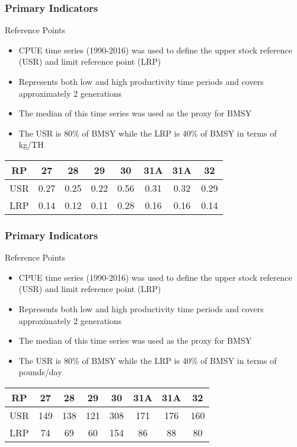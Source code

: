 \documentclass{beamer}
\begin{document}
\begin{frame}
\frametitle{Primary Indicators}
Reference Points
\begin{itemize}
\item CPUE time series (1990-2016) was used to define the upper stock reference (USR) and limit reference point (LRP) 
\item Represents both low and high productivity time periods and covers approximately 2 generations 
\item The median of this time series was used as the proxy for BMSY 
\item The USR is 80\% of BMSY while the LRP is 40\% of BMSY in terms of kg/TH
\end{itemize}
\centering
\begin{tabular}{|c|c|c|c|c|c|c|c|}
\hline
RP & 27 & 28 & 29 & 30 & 31A & 31A & 32 \\
\hline
USR & 0.27 & 0.25 & 0.22 & 0.56 & 0.31 & 0.32 & 0.29 \\
\hline
LRP & 0.14 & 0.12  & 0.11  & 0.28  & 0.16  & 0.16  & 0.14 \\
\hline
\end{tabular}
\end{frame}



\begin{frame}
\frametitle{Primary Indicators}
Reference Points
\begin{itemize}
\item CPUE time series (1990-2016) was used to define the upper stock reference (USR) and limit reference point (LRP) 
\item Represents both low and high productivity time periods and covers approximately 2 generations 
\item The median of this time series was used as the proxy for BMSY 
\item The USR is 80\% of BMSY while the LRP is 40\% of BMSY in terms of pounds/day
\end{itemize}
\centering
\begin{tabular}{|c|c|c|c|c|c|c|c|}
\hline
RP & 27 & 28 & 29 & 30 & 31A & 31A & 32 \\
\hline
USR & 149 & 138 & 121 & 308 & 171 & 176 & 160 \\
\hline
LRP & 74 & 69 & 60 & 154 & 86 & 88 & 80 \\
\hline
\end{tabular}
\end{frame}
\end{document}
